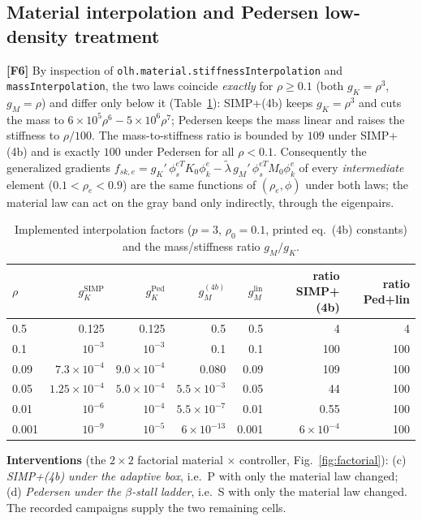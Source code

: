 \documentclass[10pt,a4paper]{article}
\newcommand{\code}[1]{\texttt{\small #1}}
\newcommand{\fact}[1]{\textbf{[F#1]}}
\begin{document}
\subsection{Material interpolation and Pedersen low-density treatment}\label{sec:material}
\fact{6} By inspection of \code{olh.material.stiffnessInterpolation} and \code{massInterpolation}, the two laws coincide \emph{exactly} for $\rho\ge0.1$ (both $g_K=\rho^3$, $g_M=\rho$) and differ only below it (Table~\ref{tab:laws}): SIMP+(4b) keeps $g_K=\rho^3$ and cuts the mass to $6\times10^5\rho^6-5\times10^6\rho^7$; Pedersen keeps the mass linear and raises the stiffness to $\rho/100$. The mass-to-stiffness ratio is bounded by $109$ under SIMP+(4b) and is exactly $100$ under Pedersen for all $\rho<0.1$. Consequently the generalized gradients $f_{sk,e}=g_K'\,\phi_s^{eT}K_0\phi_k^e-\tilde\lambda\,g_M'\,\phi_s^{eT}M_0\phi_k^e$ of every \emph{intermediate} element ($0.1<\rho_e<0.9$) are the same functions of $(\rho_e,\phi)$ under both laws; the material law can act on the gray band only indirectly, through the eigenpairs.
\begin{table}[htb]\centering\footnotesize
\caption{Implemented interpolation factors ($p=3$, $\rho_0=0.1$, printed eq.~(4b) constants) and the mass/stiffness ratio $g_M/g_K$.}
\label{tab:laws}
\begin{tabular}{lrrrrrr}\toprule
$\rho$ & $g_K^{\mathrm{SIMP}}$ & $g_K^{\mathrm{Ped}}$ & $g_M^{(4b)}$ & $g_M^{\mathrm{lin}}$ & ratio SIMP+(4b) & ratio Ped+lin\\\midrule
0.5   & 0.125 & 0.125 & 0.5 & 0.5 & 4 & 4\\
0.1   & $10^{-3}$ & $10^{-3}$ & 0.1 & 0.1 & 100 & 100\\
0.09  & $7.3\times10^{-4}$ & $9.0\times10^{-4}$ & 0.080 & 0.09 & 109 & 100\\
0.05  & $1.25\times10^{-4}$ & $5.0\times10^{-4}$ & $5.5\times10^{-3}$ & 0.05 & 44 & 100\\
0.01  & $10^{-6}$ & $10^{-4}$ & $5.5\times10^{-7}$ & 0.01 & 0.55 & 100\\
0.001 & $10^{-9}$ & $10^{-5}$ & $6\times10^{-13}$ & 0.001 & $6\times10^{-4}$ & 100\\\bottomrule
\end{tabular}
\end{table}
\par\noindent\textbf{Interventions} (the $2\times2$ factorial material $\times$ controller, Fig.~\ref{fig:factorial}): (c) \emph{SIMP+(4b) under the adaptive box}, i.e.\ P with only the material law changed; (d) \emph{Pedersen under the $\beta$-stall ladder}, i.e.\ S with only the material law changed. The recorded campaigns supply the two remaining cells.
\end{document}
